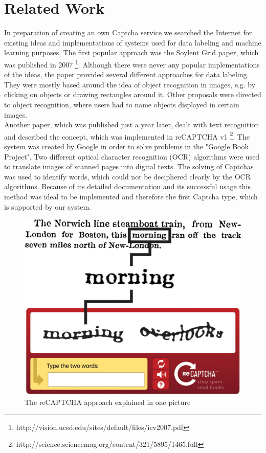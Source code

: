 \section{Related Work}
\label{sec:related_work}

In preparation of creating an own Captcha service we searched the Internet for existing ideas and implementations of systems used for data labeling and machine learning purposes. The first popular approach was the Soylent Grid paper, which was published in 2007 \footnote{http://vision.ucsd.edu/sites/default/files/icv2007.pdf}. Although there were never any popular implementations of the ideas, the paper provided several different approaches for data labeling. They were mostly based around the idea of object recognition in images, e.g. by clicking on objects or drawing rectangles around it. Other proposals were directed to object recognition, where users had to name objects displayed in certain images.\\
Another paper, which was published just a year later, dealt with text recognition and described the concept, which was implemented in reCAPTCHA v1 \footnote{http://science.sciencemag.org/content/321/5895/1465.full}. The system was created by Google in order to solve problems in the "Google Book Project". Two different optical character recognition (OCR) algorithms were used to translate images of scanned pages into digital texts. The solving of Captchas was used to identify words, which could not be deciphered clearly by the OCR algorithms. Because of its detailed documentation and its successful usage this method was ideal to be implemented and therefore the first Captcha type, which is supported by our system. \\
\begin{figure}[!h]
	\centering
	\includegraphics[width=0.4\linewidth]{content/figures/recaptcha.jpg}
	\caption{The reCAPTCHA approach explained in one picture}
	\label{fig:recaptcha}
\end{figure}

\clearpage
